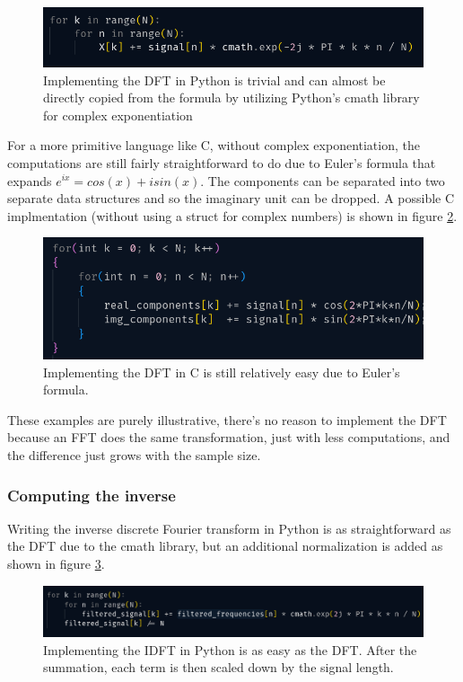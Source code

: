 \begin{figure}[ht]
    \centering
    \includegraphics[width=\textwidth]{./images/pyDFT.png}
    \caption{Implementing the DFT in Python is trivial and can almost be directly copied from the formula by utilizing Python's cmath library for complex exponentiation \label{fig:pyDFT}}
\end{figure}

For a more primitive language like C, without complex exponentiation, the computations are still fairly straightforward to do due to Euler's formula that expands $e^{ix} = cos(x) + isin(x)$. The components can be separated into two separate data structures and so the imaginary unit can be dropped. A possible C implmentation (without using a struct for complex numbers) is shown in figure \ref{fig:cDFT}. 

\begin{figure}[ht]
    \centering
    \includegraphics[width=\textwidth]{./images/cDFT.png}
    \caption{Implementing the DFT in C is still relatively easy due to Euler's formula. \label{fig:cDFT}}
\end{figure}

These examples are purely illustrative, there's no reason to implement the DFT because an FFT does the same transformation, just with less computations, and the difference just grows with the sample size.
\subsubsection{Computing the inverse}
Writing the inverse discrete Fourier transform in Python is as straightforward as the DFT due to the cmath library, but an additional normalization is added as shown in figure \ref{fig:IDFT}. 

\begin{figure}[ht]
    \centering
    \includegraphics[width=\textwidth]{./images/IDFT.png}
    \caption{Implementing the IDFT in Python is as easy as the DFT. After the summation, each term is then scaled down by the signal length. \label{fig:IDFT}}
\end{figure}

